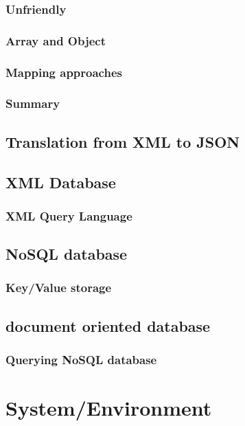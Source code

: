 \documentclass[a4paper,12pt]{article}
\begin{document}
			\subsubsection{Unfriendly}
			\subsubsection{Array and Object}
			\subsubsection{Mapping approaches}
			\subsubsection{Summary}
		\subsection{Translation from XML to JSON}
			
		\subsection{XML Database}
			\subsubsection{XML Query Language}
		\subsection{NoSQL database}
			\subsubsection{Key/Value storage}
			\subsection{document oriented database}
		\subsubsection{Querying NoSQL database}
	\newpage
	\section{System/Environment}
\end{document}
